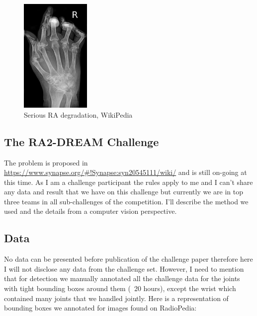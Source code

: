 \documentclass[a4paper,12pt]{article}
\begin{document}
\vspace{4mm}

\begin{figure}[H]
    \centering
    \includegraphics[width=0.3\textwidth]{ra/RheumatoideArthritisAP.jpg}
    \caption{Serious RA degradation, WikiPedia}
    \label{fig:ra_wiki}
\end{figure}

\vspace{4mm}

\subsection{The RA2-DREAM Challenge}

\vspace{4mm}

\par The problem is proposed in \url{https://www.synapse.org/#!Synapse:syn20545111/wiki/} and is still on-going at this time. As I am a challenge participant the rules apply to me and I can't share any data and result that we have on this challenge but currently we are in top three teams in all sub-challenges of the competition. I'll describe the method we used and the details from a computer vision perspective.

\vspace{4mm}

\subsection{Data}

\vspace{4mm}

\par No data can be presented before publication of the challenge paper therefore here I will not disclose any data from the challenge set. However, I need to mention that for detection we manually annotated all the challenge data for the joints with tight bounding boxes around them (~20 hours), except the wrist which contained many joints that we handled jointly. Here is a representation of bounding boxes we annotated for images found on RadioPedia:
\end{document}
